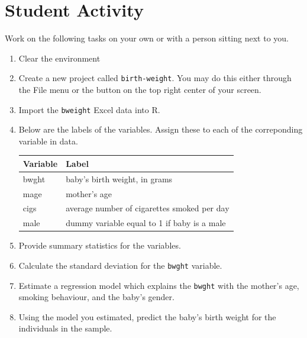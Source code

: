 \documentclass[
  letterpaper,
  DIV=11,
  numbers=noendperiod]{scrreprt}
\begin{document}
\chapter{Student Activity}\label{student-activity}

Work on the following tasks on your own or with a person sitting next to
you.

\begin{enumerate}
\def\labelenumi{\arabic{enumi}.}
\item
  Clear the environment
\item
  Create a new project called \texttt{birth-weight}. You may do this
  either through the File menu or the button on the top right center of
  your screen.
\item
  Import the \texttt{bweight} Excel data into R.
\item
  Below are the labels of the variables. Assign these to each of the
  correponding variable in data.

  \begin{longtable}[]{@{}ll@{}}
  \toprule\noalign{}
  Variable & Label \\
  \midrule\noalign{}
  \endhead
  \bottomrule\noalign{}
  \endlastfoot
  bwght & baby's birth weight, in grams \\
  mage & mother's age \\
  cigs & average number of cigarettes smoked per day \\
  male & dummy variable equal to 1 if baby is a male \\
  \end{longtable}
\item
  Provide summary statistics for the variables.
\item
  Calculate the standard deviation for the \texttt{bwght} variable.
\item
  Estimate a regression model which explains the \texttt{bwght} with the
  mother's age, smoking behaviour, and the baby's gender.
\item
  Using the model you estimated, predict the baby's birth weight for the
  individuals in the sample.
\end{enumerate}
\end{document}
